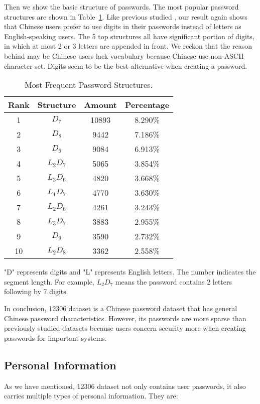 Then we show the basic structure of passwords. The most popular password structures are shown in Table~\ref{t2}. Like previous studied \cite{li2014large}, our result again shows that Chinese users prefer to use digits in their passwords instead of letters as English-speaking users. The 5 top structures all have significant portion of digits, in which at most 2 or 3 letters are appended in front. We reckon that the reason behind may be Chinese users lack vocabulary because Chinese use non-ASCII character set. Digits seem to be the best alternative when creating a password.

\begin{table}
\centering
\caption{Most Frequent Password Structures.}
\begin{tabular}{|c|c|c|c|} \hline
Rank&Structure&Amount&Percentage\\ \hline
1&$D_7$&10893&8.290\%\\ 
2&$D_8$&9442&7.186\%\\ 
3&$D_6$&9084&6.913\%\\ 
4&$L_2D_7$&5065&3.854\%\\ 
5&$L_3D_6$&4820&3.668\%\\ 
6&$L_1D_7$&4770&3.630\%\\ 
7&$L_2D_6$&4261&3.243\%\\ 
8&$L_3D_7$&3883&2.955\%\\ 
9&$D_9$&3590&2.732\%\\ 
10&$L_2D_8$&3362&2.558\%\\ 
\hline\end{tabular}
\label{t2}
\begin{tablenotes}
      \small
      \item "D" represents digits and "L" represents English letters. The number indicates the segment length. For example, $L_2D_7$ means the password contains 2 letters following by 7 digits.
    \end{tablenotes}
\end{table}

In conclusion, 12306 dataset is a Chinese password dataset that has general Chinese password characteristics. However, its passwords are more sparse than previously studied datasets because users concern security more when creating passwords for important systems. 

\subsection{Personal Information}
As we have mentioned, 12306 dataset not only contains user passwords, it also carries multiple types of personal information. They are:

